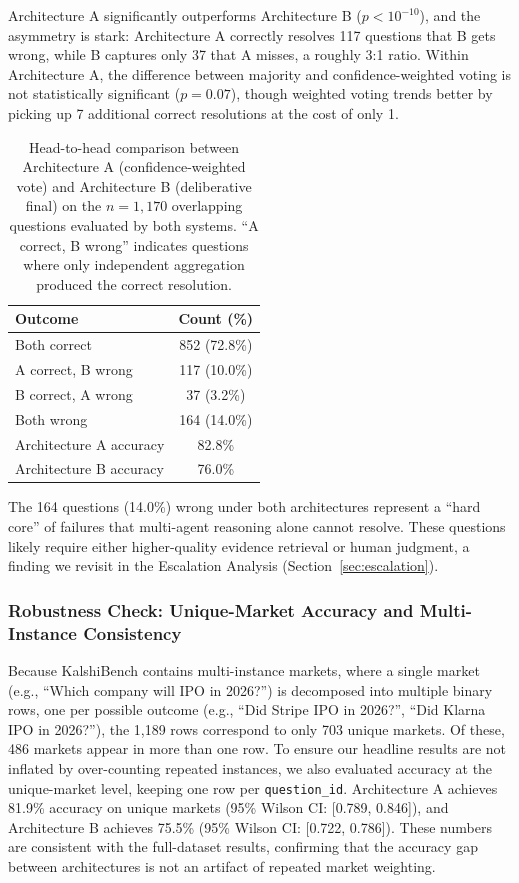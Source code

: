 Architecture A significantly outperforms Architecture B ($p < 10^{-10}$), and the asymmetry is stark: Architecture A correctly resolves 117 questions that B gets wrong, while B captures only 37 that A misses, a roughly 3:1 ratio. Within Architecture A, the difference between majority and confidence-weighted voting is not statistically significant ($p = 0.07$), though weighted voting trends better by picking up 7 additional correct resolutions at the cost of only 1.

\begin{table}[t]
\centering
\caption{Head-to-head comparison between Architecture A (confidence-weighted vote) and Architecture B (deliberative final) on the $n = 1{,}170$ overlapping questions evaluated by both systems. ``A correct, B wrong'' indicates questions where only independent aggregation produced the correct resolution.}
\label{tab:h2h}
\begin{tabular}{lc}
\toprule
\textbf{Outcome} & \textbf{Count (\%)} \\
\midrule
Both correct       & 852 (72.8\%) \\
A correct, B wrong & 117 (10.0\%) \\
B correct, A wrong &  37 (3.2\%) \\
Both wrong         & 164 (14.0\%) \\
\midrule
Architecture A accuracy & 82.8\% \\
Architecture B accuracy & 76.0\% \\
\bottomrule
\end{tabular}
\end{table}

The 164 questions (14.0\%) wrong under both architectures represent a ``hard core'' of failures that multi-agent reasoning alone cannot resolve. These questions likely require either higher-quality evidence retrieval or human judgment, a finding we revisit in the Escalation Analysis (Section~\ref{sec:escalation}).

\subsubsection{Robustness Check: Unique-Market Accuracy and Multi-Instance Consistency}

Because KalshiBench contains multi-instance markets, where a single market (e.g., ``Which company will IPO in 2026?'') is decomposed into multiple binary rows, one per possible outcome (e.g., ``Did Stripe IPO in 2026?'', ``Did Klarna IPO in 2026?''), the 1,189 rows correspond to only 703 unique markets. Of these, 486 markets appear in more than one row. To ensure our headline results are not inflated by over-counting repeated instances, we also evaluated accuracy at the unique-market level, keeping one row per \texttt{question\_id}. Architecture A achieves 81.9\% accuracy on unique markets (95\% Wilson CI: [0.789, 0.846]), and Architecture B achieves 75.5\% (95\% Wilson CI: [0.722, 0.786]). These numbers are consistent with the full-dataset results, confirming that the accuracy gap between architectures is not an artifact of repeated market weighting.

